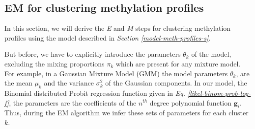 \subsection{EM for clustering methylation profiles}
In this section, we will derive the \emph{E} and \emph{M} steps for clustering methylation profiles using the model described in \emph{Section \ref{model-meth-profiles-s}}.

But before, we have to explicitly introduce the parameters $\theta_{k}$ of the model, excluding the mixing proportions $\pi_{k}$ which are present for any mixture model. For example, in a Gaussian Mixture Model (GMM) the model parameters $\theta_{k}$, are the mean $\mu_{k}$ and the variance $\sigma_{k}^{2}$ of the Gaussian components. In our model, the Binomial distributed Probit regression function given in \emph{Eq. \ref{likel-binom-prob-log-f}}, the parameters are the coefficients of the $n^{th}$ degree polynomial function $\mathbf{g}_{i}$. Thus, during the EM algorithm we infer these sets of parameters for each cluster $k$.

